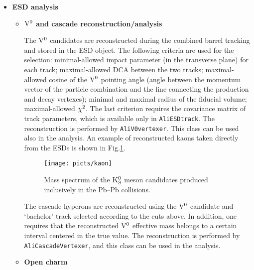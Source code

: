 \documentclass[12pt,a4paper,twoside]{article}
\begin{document}
{\begin{itemize}
\item\textbf{ESD analysis }

  \begin{itemize}
  \item[ ] \textbf{${\rm V^0}$ and cascade reconstruction/analysis}

    The ${\rm V^0}$ candidates
    are reconstructed during the combined barrel tracking and stored in 
    the ESD object.  The following criteria are used for the selection:
    minimal-allowed impact parameter (in the transverse plane) for each
    track; maximal-allowed DCA between the two tracks;  maximal-allowed
    cosine of the 
    ${\rm V^0}$ pointing angle 
    (angle between the momentum vector of the particle combination
    and the line connecting the production and decay vertexes);  minimal
    and maximal radius of the fiducial volume; maximal-allowed ${\rm
      \chi^2}$. The 
    last criterion requires the covariance matrix of track parameters,
    which is available only in \texttt{AliESDtrack}. The reconstruction
    is performed by \texttt{AliV0vertexer}. This class can be used also
    in the analysis. An example of reconstructed kaons taken directly
    from the ESDs is shown in Fig.\ref{CH6Fig:kaon}. 

    \begin{figure}[th]
      \centering
      \texttt{[image: picts/kaon]}
      \caption{Mass spectrum of the ${\rm K_S^0}$ meson candidates produced
        inclusively in the \mbox{Pb--Pb} collisions.}
      \label{CH6Fig:kaon}
    \end{figure}

    The cascade hyperons are reconstructed using the ${\rm V^0}$ candidate and
    `bachelor' track selected according to the cuts above. In addition,
    one requires that the reconstructed ${\rm V^0}$ effective mass belongs to
    a certain interval centered in the true value.  The reconstruction
    is performed by \texttt{AliCascadeVertexer}, and this class can be
    used in the analysis.

  \item[ ] \textbf{Open charm}


\end{itemize}
\end{itemize}}
\end{document}
